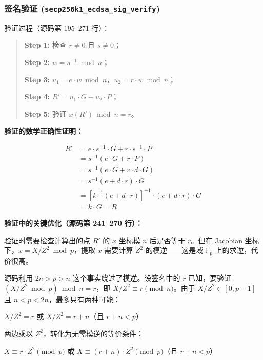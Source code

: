 \documentclass[a4paper,12pt]{ctexart}
\begin{document}
\subsubsection{签名验证 (\texttt{secp256k1\_ecdsa\_sig\_verify})}

验证过程（源码第 195--271 行）：

\begin{quote}
\textbf{Step 1:} 检查 $r \neq 0$ 且 $s \neq 0$；

\textbf{Step 2:} $w = s^{-1} \bmod n$；

\textbf{Step 3:} $u_1 = e \cdot w \bmod n$，$u_2 = r \cdot w \bmod n$；

\textbf{Step 4:} $R' = u_1 \cdot G + u_2 \cdot P$；

\textbf{Step 5:} 验证 $x(R') \bmod n = r$。
\end{quote}

\textbf{验证的数学正确性证明：}

\begin{equation}
\begin{aligned}
R' &= e \cdot s^{-1} \cdot G + r \cdot s^{-1} \cdot P \\
   &= s^{-1}(e \cdot G + r \cdot P) \\
   &= s^{-1}(e \cdot G + r \cdot d \cdot G) \\
   &= s^{-1}(e + d \cdot r) \cdot G \\
   &= [k^{-1}(e + d \cdot r)]^{-1} \cdot (e + d \cdot r) \cdot G \\
   &= k \cdot G = R
\end{aligned}
\end{equation}

\textbf{验证中的关键优化（源码第 241--270 行）：}

验证时需要检查计算出的点 $R'$ 的 $x$ 坐标模 $n$ 后是否等于 $r$。但在 Jacobian 坐标下，$x = X/Z^2 \bmod p$，提取 $x$ 需要计算 $Z^2$ 的模逆——这是域 $\mathbb{F}_p$ 上的求逆，代价很高。

源码利用 $2n > p > n$ 这个事实绕过了模逆。设签名中的 $r$ 已知，要验证 $(X/Z^2 \bmod p) \bmod n = r$，即 $X/Z^2 \equiv r \pmod{n}$。由于 $X/Z^2 \in [0, p-1]$ 且 $n < p < 2n$，最多只有两种可能：

\begin{center}
$X/Z^2 = r$ \quad 或 \quad $X/Z^2 = r + n$（且 $r + n < p$）
\end{center}

两边乘以 $Z^2$，转化为无需模逆的等价条件：

\begin{center}
$X \equiv r \cdot Z^2 \pmod{p}$ \quad 或 \quad $X \equiv (r + n) \cdot Z^2 \pmod{p}$（且 $r + n < p$）
\end{center}
\end{document}
